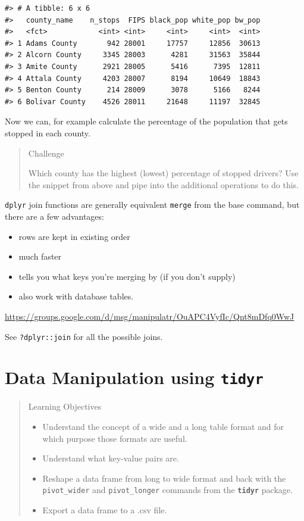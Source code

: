 \documentclass[]{book}
\providecommand{\tightlist}{%
  \setlength{\itemsep}{0pt}\setlength{\parskip}{0pt}}
\begin{document}
\begin{verbatim}
#> # A tibble: 6 x 6
#>   county_name    n_stops  FIPS black_pop white_pop bw_pop
#>   <fct>            <int> <int>     <int>     <int>  <int>
#> 1 Adams County       942 28001     17757     12856  30613
#> 2 Alcorn County     3345 28003      4281     31563  35844
#> 3 Amite County      2921 28005      5416      7395  12811
#> 4 Attala County     4203 28007      8194     10649  18843
#> 5 Benton County      214 28009      3078      5166   8244
#> 6 Bolivar County    4526 28011     21648     11197  32845
\end{verbatim}

Now we can, for example calculate the percentage of the population that gets stopped in each county.

\begin{quote}
Challenge

Which county has the highest (lowest) percentage of stopped drivers?
Use the snippet from above and pipe into the additional operations
to do this.
\end{quote}

\texttt{dplyr} join functions are generally equivalent \texttt{merge} from the base command, but there are a few advantages:

\begin{itemize}
\tightlist
\item
  rows are kept in existing order
\item
  much faster
\item
  tells you what keys you're merging by (if you don't supply)
\item
  also work with database tables.
\end{itemize}

\url{https://groups.google.com/d/msg/manipulatr/OuAPC4VyfIc/Qnt8mDfq0WwJ}

See \texttt{?dplyr::join} for all the possible joins.

\hypertarget{tidyr}{%
\chapter{\texorpdfstring{Data Manipulation using \textbf{\texttt{tidyr}}}{Data Manipulation using tidyr}}\label{tidyr}}

\begin{quote}
Learning Objectives

\begin{itemize}
\tightlist
\item
  Understand the concept of a wide and a long table format and for which purpose those formats are useful.
\item
  Understand what key-value pairs are.
\item
  Reshape a data frame from long to wide format and back with the \texttt{pivot\_wider} and \texttt{pivot\_longer} commands from the \textbf{\texttt{tidyr}} package.
\item
  Export a data frame to a .csv file.
\end{itemize}
\end{quote}
\end{document}
